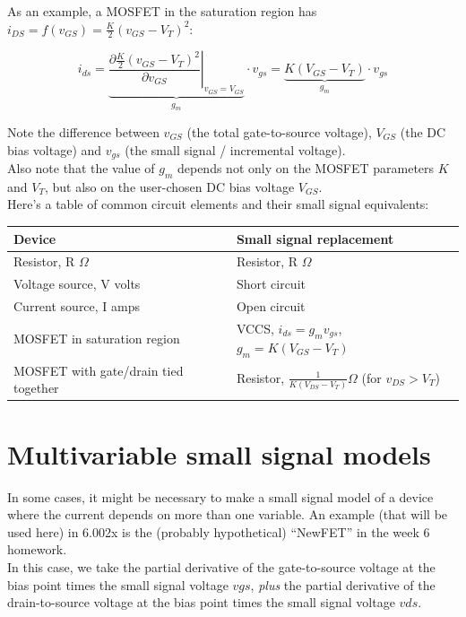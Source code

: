 \documentclass[12pt,a4paper]{report}
\begin{document}
As an example, a MOSFET in the saturation region has $i_{DS} = f(v_{GS}) = \frac{K}{2}(v_{GS} - V_T)^2$:

\[ i_{ds} = \underbrace { \left. \frac{ \partial \frac{K}{2}(v_{GS} - V_T)^2 }{\partial v_{GS}} \right|_{v_{GS}=V_{GS} }}_{\displaystyle g_m} \cdot v_{gs} = \underbrace{ K(V_{GS} - V_T)}_{\displaystyle g_m} \cdot v_{gs} \]

Note the difference between $v_{GS}$ (the total gate-to-source voltage), $V_{GS}$ (the DC bias voltage) and $v_{gs}$ (the small signal / incremental voltage). \\
Also note that the value of $g_m$ depends not only on the MOSFET parameters $K$ and $V_T$, but also on the user-chosen DC bias voltage $V_{GS}$.\\

Here's a table of common circuit elements and their small signal equivalents:\\

\begin{tabular}{| l | l |}
\hline
Device & Small signal replacement \\ \hline
Resistor, R $\Omega$        & Resistor, R $\Omega$ \\ \hline
Voltage source, V volts     & Short circuit \\ \hline
Current source, I amps      & Open circuit \\ \hline
MOSFET in saturation region & VCCS, $i_{ds} = g_m v_{gs}$, $g_m = K(V_{GS} - V_T)$ \\ \hline 
MOSFET with gate/drain tied together & Resistor, $\displaystyle \frac{1}{K(V_{DS} - V_T)} \Omega$ (for $v_{DS} > V_T$) \\ \hline
\end{tabular}

\newpage

\section{Multivariable small signal models}
In some cases, it might be necessary to make a small signal model of a device where the current depends on more than one variable. An example (that will be used here) in 6.002x is the (probably hypothetical) ``NewFET'' in the week 6 homework.\\
In this case, we take the partial derivative of the gate-to-source voltage at the bias point times the small signal voltage $vgs$, \emph{plus} the partial derivative of the drain-to-source voltage at the bias point times the small signal voltage $vds$.
\end{document}
